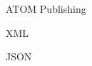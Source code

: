 \begin{questions}{ATOM Publishing}
	\begin{questionAnswer}
		\qItem{}{}
	\end{questionAnswer}
\end{questions}

\begin{questions}{XML}
	\begin{questionAnswer}
		\qItem{}{}
	\end{questionAnswer}
\end{questions}

\begin{questions}{JSON}
	\begin{questionAnswer}
		\qItem{}{}
	\end{questionAnswer}
\end{questions}

